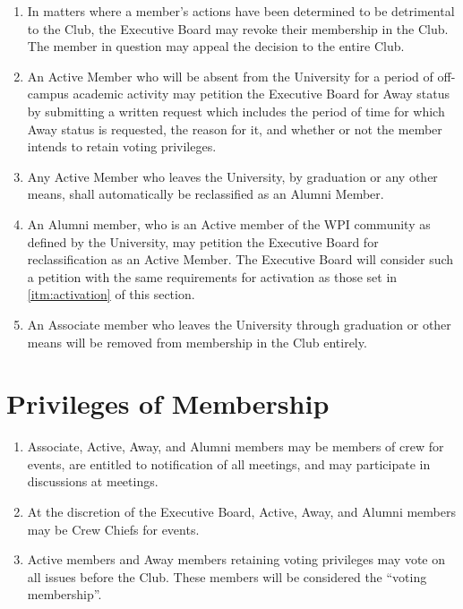 \documentclass[12pt,letterpaper,oneside]{book}
\begin{document}
\begin{enumerate}
\item \label{itm:expulsion} In matters where a member's actions have been determined to be detrimental to the Club, the Executive Board may revoke their membership in the Club.  The member in question may appeal the decision to the entire Club.
\item \label{itm:awaystatus} An Active Member who will be absent from the University for a period of off-campus academic activity may petition the Executive Board for Away status by submitting a written request which includes the period of time for which Away status is requested, the reason for it, and whether or not the member intends to retain voting privileges. 
\item \label{itm:alumnistatus} Any Active Member who leaves the University, by graduation or any other means, shall automatically be reclassified as an Alumni Member.
\item \label{itm:reactivation} An Alumni member, who is an Active member of the WPI community as defined by the University, may petition the Executive Board for reclassification as an Active Member. The Executive Board will consider such a petition with the same requirements for activation as those set in \cref{itm:activation} of this section.
\item \label{itm:associategraduation} An Associate member who leaves the University through graduation or other means will be removed from membership in the Club entirely.

\end{enumerate}

\section{Privileges of Membership}

\begin{enumerate}

\item Associate, Active, Away, and Alumni members may be members of crew for events, are entitled to notification of all meetings, and may participate in discussions at meetings.
\item At the discretion of the Executive Board, Active, Away, and Alumni members may be Crew Chiefs for events.
\item Active members and Away members retaining voting privileges may vote on all issues before the Club. These members will be considered the “voting membership”.

\end{enumerate}
\end{document}
